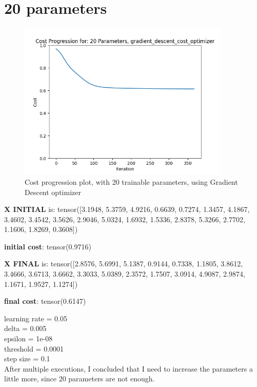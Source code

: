 \documentclass[inscr,ack,preface]{diphdthesis}
\begin{document}
\section{20 parameters}

\begin{figure}[H]
\begin{center}
    \includegraphics[width=0.9\textwidth]{20.png}
    \caption{Cost progression plot, with 20 trainable parameters, using Gradient Descent optimizer} 
    \label{fig:enter-label}
    \end{center}
\end{figure}

\textbf{X INITIAL} is: tensor([3.1948, 5.3759, 4.9216, 0.6639, 0.7274, 1.3457, 4.1867, 3.4602, 3.4542,
        3.5626, 2.9046, 5.0324, 1.6932, 1.5336, 2.8378, 5.3266, 2.7702, 1.1606,
        1.8269, 0.3608])

\textbf{initial cost}: tensor(0.9716)

\textbf{X FINAL} is: tensor([2.8576, 5.6991, 5.1387, 0.9144, 0.7338, 1.1805, 3.8612, 3.4666, 3.6713, 3.6662, 3.3033, 5.0389, 2.3572, 1.7507, 3.0914, 4.9087, 2.9874, 1.1671, 1.9527, 1.1274])

\textbf{final cost}: tensor(0.6147)

learning rate =  0.05 \\
delta =  0.005 \\
epsilon =  1e-08 \\
threshold =  0.0001\\
step size =  0.1 \\

After multiple executions, I concluded that I need to increase the parameters a little more, since 20 parameters are not enough.
\end{document}
